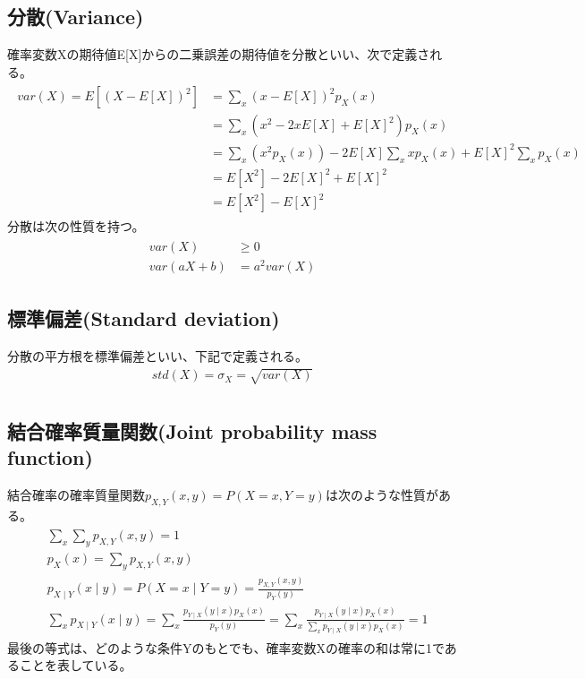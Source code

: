 \documentclass[a4j]{jarticle}
\begin{document}
\subsection{分散(Variance)}
確率変数Xの期待値E[X]からの二乗誤差の期待値を分散といい、次で定義される。
\begin{align}
    \begin{aligned}
    var(X)=E[(X-E[X])^{2}]&=\sum_{x}(x-E[X])^{2}p_{X}(x) \\
    &=\sum_{x}(x^{2}-2xE[X]+E[X]^{2})p_{X}(x) \\
    &=\sum_{x}(x^{2}p_{X}(x))-2E[X]\sum_{x}xp_{X}(x)+E[X]^{2}\sum_{x}p_{X}(x) \\
    &=E[X^2]-2E[X]^2+E[X]^2 \\
    &=E[X^2]-E[X]^2
    \end{aligned}
\end{align}
分散は次の性質を持つ。
\begin{align}
    \begin{aligned}
    var(X) &\geq 0 \\
    var(aX+b) &= a^2var(X)
    \end{aligned}
\end{align}

\subsection{標準偏差(Standard deviation)}
分散の平方根を標準偏差といい、下記で定義される。
\begin{align}
    std(X) = \sigma_{X} = \sqrt{var(X)} \\
\end{align}

\subsection{結合確率質量関数(Joint probability mass function)}
結合確率の確率質量関数$p_{X,Y}(x,y)=P(X=x, Y=y)$は次のような性質がある。
\begin{align}
    \begin{aligned}
    &\sum_{x}\sum_{y}p_{X,Y}(x,y)=1 \\
    &p_{X}(x)=\sum_{y}p_{X,Y}(x,y) \\
    &p_{X \mid Y}(x \mid y)=P(X=x \mid Y=y)=\frac{p_{X,Y}(x,y)}{p_{Y}(y)} \\
    &\sum_{x}p_{X \mid Y}(x \mid y)=\sum_{x}\frac{p_{Y \mid X}(y \mid x)p_{X}(x)}{p_{Y}(y)}
    =\sum_{x}\frac{p_{Y \mid X}(y \mid x)p_{X}(x)}{\sum_{x}p_{Y \mid X}(y \mid x)p_{X}(x)}=1
    \end{aligned}
\end{align}
最後の等式は、どのような条件Yのもとでも、確率変数Xの確率の和は常に1であることを表している。
\end{document}
